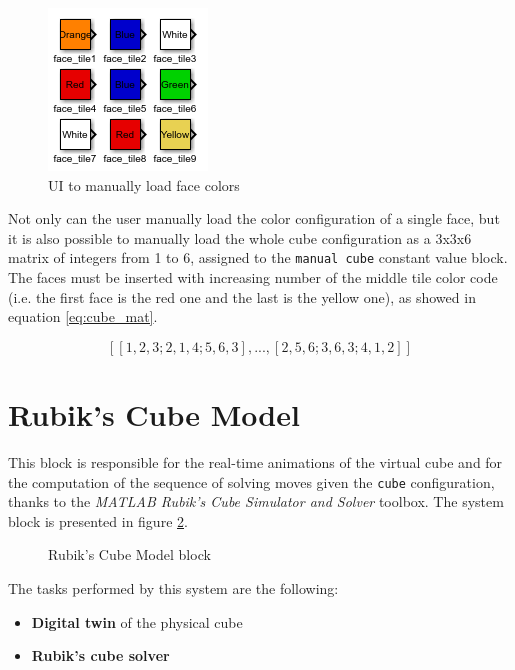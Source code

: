 \documentclass{report}
\begin{document}
\begin{figure}[h!]
    \centering
    \includegraphics[width=0.3\linewidth]{images/webcam_manager/load_face.png}
    \caption{UI to manually load face colors}
    \label{fig:load_face}
\end{figure}

Not only can the user manually load the color configuration of a single face, but it is also possible to manually load the whole cube configuration as a 3x3x6 matrix of integers from 1 to 6, assigned to the \texttt{manual cube} constant value block. The faces must be inserted with increasing number of the middle tile color code (i.e. the first face is the red one and the last is the yellow one), as showed in equation \ref{eq:cube_mat}.

\begin{equation}\label{eq:cube_mat}
    [[1, 2, 3; 2, 1, 4; 5, 6, 3], ..., [2, 5, 6; 3, 6, 3; 4, 1, 2]]
\end{equation}

\section{Rubik's Cube Model} \label{sec:rub-cub-mod}
This block is responsible for the real-time animations of the virtual cube and for the computation of the sequence of solving moves given the \texttt{cube} configuration, thanks to the \textit{MATLAB Rubik's Cube Simulator and Solver} toolbox. The system block is presented in figure \ref{fig:cube_model_block}.

\begin{figure}[h]
    \centering
    
    \caption{Rubik's Cube Model block}
    \label{fig:cube_model_block}
\end{figure}

The tasks performed by this system are the following:
\begin{itemize}
    \item \textbf{Digital twin} of the physical cube
    \item \textbf{Rubik's cube solver}
\end{itemize}
\end{document}
